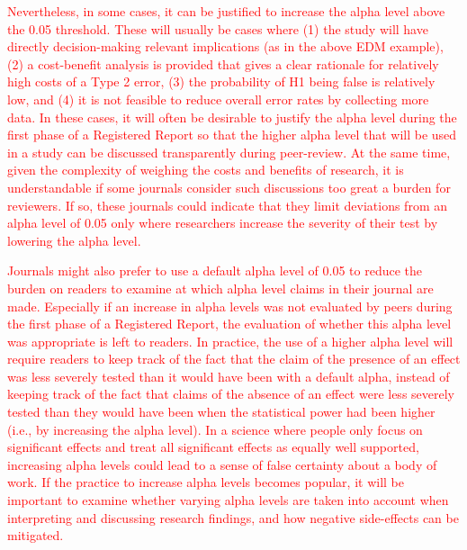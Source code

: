 \documentclass[
  english,
  ,man, a4paper,floatsintext]{apa6}
\begin{document}
\textcolor{red}{Nevertheless, in some cases, it can be justified to increase the alpha level above the 0.05 threshold. These will usually be cases where (1) the study will have directly decision-making relevant implications (as in the above EDM example), (2) a cost-benefit analysis is provided that gives a clear rationale for relatively high costs of a Type 2 error, (3) the probability of H1 being false is relatively low, and (4) it is not feasible to reduce overall error rates by collecting more data. In these cases, it will often be desirable to justify the alpha level during the first phase of a Registered Report so that the higher alpha level that will be used in a study can be discussed transparently during peer-review. At the same time, given the complexity of weighing the costs and benefits of research, it is understandable if some journals consider such discussions too great a burden for reviewers. If so, these journals could indicate that they limit deviations from an alpha level of 0.05 only where researchers increase the severity of their test by lowering the alpha level.}

\textcolor{red}{Journals might also prefer to use a default alpha level of 0.05 to reduce the burden on readers to examine at which alpha level claims in their journal are made. Especially if an increase in alpha levels was not evaluated by peers during the first phase of a Registered Report, the evaluation of whether this alpha level was appropriate is left to readers. In practice, the use of a higher alpha level will require readers to keep track of the fact that the claim of the presence of an effect was less severely tested than it would have been with a default alpha, instead of keeping track of the fact that claims of the absence of an effect were less severely tested than they would have been when the statistical power had been higher (i.e., by increasing the alpha level). In a science where people only focus on significant effects and treat all significant effects as equally well supported, increasing alpha levels could lead to a sense of false certainty about a body of work. If the practice to increase alpha levels becomes popular, it will be important to examine whether varying alpha levels are taken into account when interpreting and discussing research findings, and how negative side-effects can be mitigated.}
\end{document}
